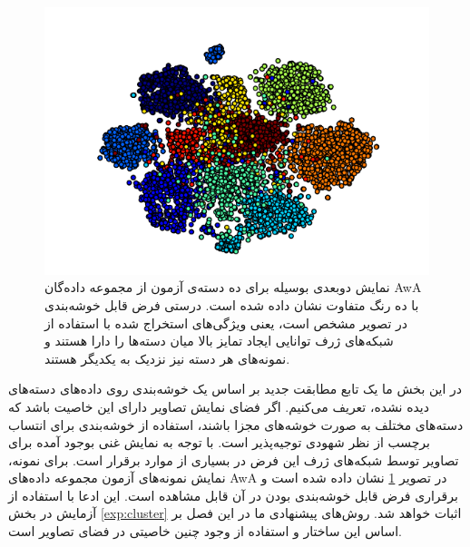 \begin{figure}[!t]
\centering
\includegraphics[width=0.85\linewidth]{images/awa_clusters}
\caption[نمایش دسته‌های آزمون مجموعه داده‌گان AwA ]{
نمایش دوبعدی بوسیله  برای ده دسته‌ی آزمون از مجموعه داده‌گان AwA با ده رنگ متفاوت نشان داده شده است. درستی فرض قابل خوشه‌بندی در تصویر مشخص است، یعنی ویژگی‌های استخراج شده با استفاده از شبکه‌های ژرف توانایی ایجاد تمایز بالا میان دسته‌ها را دارا هستند و نمونه‌های هر دسته نیز نزدیک به یکدیگر هستند.
}
\label{fig:awa_clusters}
\end{figure}

در این بخش ما یک تابع مطابقت جدید بر اساس یک خوشه‌بندی روی داده‌های دسته‌های دیده نشده، تعریف می‌کنیم. اگر فضای نمایش تصاویر دارای این خاصیت باشد که دسته‌های مختلف به صورت خوشه‌های مجزا باشند، استفاده از خوشه‌بندی برای انتساب برچسب از نظر شهودی توجیه‌پذیر است.
با توجه به نمایش غنی بوجود آمده برای تصاویر توسط شبکه‌های ژرف این فرض در بسیاری از موارد برقرار است. برای نمونه، نمایش  نمونه‌های آزمون مجموعه داده‌های AwA در تصویر
\ref{fig:awa_clusters}
نشان داده شده است و برقراری فرض قابل خوشه‌بندی بودن در آن قابل مشاهده است. این ادعا با استفاده از آزمایش در بخش
\ref{exp:cluster}
اثبات خواهد شد. روش‌های پیشنهادی ما در این فصل بر اساس این ساختار و استفاده از وجود چنین خاصیتی در فضای تصاویر است.

